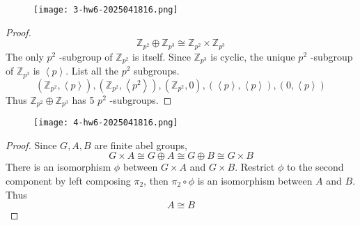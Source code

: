\begin{exercise}
\begin{figure}[H]
\centering
\texttt{[image: 3-hw6-2025041816.png]}
\label{}
\end{figure}
\end{exercise}
\begin{proof}
\[
\mathbb{Z}_{p^2}\oplus \mathbb{Z}_{p^3}\cong \mathbb{Z}_{p^2}\times \mathbb{Z}_{p^3}
\]
The only $p^2$ -subgroup of $\mathbb{Z}_{p^2}$ is itself. Since $\mathbb{Z}_{p^3}$ is cyclic, the unique $p^2$ -subgroup of $\mathbb{Z}_{p^3}$ is $\left< p \right>$. List all the $p^2$ subgroups.
\[
(\mathbb{Z}_{p^2},\left< p \right> ),(\mathbb{Z}_{p^2},\left< p^2 \right> ),(\mathbb{Z}_{p^2},0),(\left< p \right> ,\left< p \right> ),(0,\left< p \right> )
\]
Thus $\mathbb{Z}_{p^2}\oplus \mathbb{Z}_{p^3}$ has 5 $p^2$ -subgroups.

\end{proof}

\begin{exercise}
\begin{figure}[H]
\centering
\texttt{[image: 4-hw6-2025041816.png]}
\label{}
\end{figure}
\end{exercise}
\begin{proof}
Since $G,A,B$ are finite abel groups,
\[
G\times A\cong G\oplus A\cong G\oplus B\cong G\times B
\]
There is an isomorphism $\phi$ between $G\times A$ and $G\times B$. Restrict $\phi$ to the second component by left composing $\pi_2$, then $\pi_2\circ \phi$ is an isomorphism between $A$ and $B$. Thus
\[
A\cong B
\]
\end{proof}
